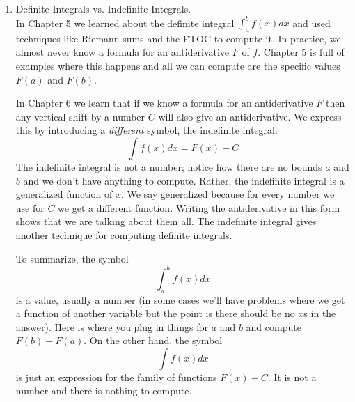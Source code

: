 \documentclass[11pt,letterpaper]{article}
\begin{document}
\begin{enumerate}
\item Definite Integrals vs. Indefinite Integrals. \\
In Chapter 5 we learned about the definite integral $\int_a^bf(x)dx$ and used techniques like Riemann sums and the FTOC to compute it.  In practice, we almost never know a formula for an antiderivative $F$ of $f$.  Chapter 5 is full of examples where this happens and all we can compute are the specific values $F(a)$ and $F(b)$.

In Chapter 6 we learn that if we know a formula for an antiderivative $F$ then any vertical shift by a number $C$ will also give an antiderivative.  We express this by introducing a {\it different} symbol, the indefinite integral:
\[\int f(x)dx=F(x)+C\]
The indefinite integral is not a number; notice how there are no bounds $a$ and $b$ and we don't have anything to compute.  Rather, the indefinite integral is a generalized function of $x$.  We say generalized because for every number we use for $C$ we get a different function.  Writing the antiderivative in this form shows that we are talking about them all.  The indefinite integral gives another technique for computing definite integrals.  

To summarize, the symbol 
\[\int_a^bf(x)dx\]
is a value, usually a number (in some cases we'll have problems where we get a function of another variable but the point is there should be no $x$s in the answer).  Here is where you plug in things for $a$ and $b$ and compute $F(b)-F(a)$.  On the other hand, the symbol
\[\int f(x)dx\]
is just an expression for the family of functions $F(x)+C$.  It is not a number and there is nothing to compute.

\end{enumerate}
\end{document}
